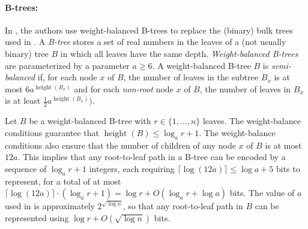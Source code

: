 \documentclass{patmorin}
\DeclareMathOperator{\height}{height}
\renewcommand{\ge}{\geqslant}
\renewcommand{\le}{\leqslant}
\newcommand{\defin}[1]{\emph{\textcolor{brightmaroon}{#1}}}
\begin{document}

\paragraph{B-trees:}

  In \cite{alstrup.rauhe:improved}, the authors use weight-balanced B-trees to replace the (binary) bulk trees used in \cite{dujmovic.esperet.ea:adjacency}.  A \defin{B-tree} stores a set of real numbers in the leaves of a (not usually binary) tree $B$ in which all leaves have the same depth. \defin{Weight-balanced B-trees} are parameterized by a parameter $a\ge 6$.  A weight-balanced B-tree $B$ is \defin{semi-balanced} if, for each node $x$ of $B$, the number of leaves in the subtree $B_x$ is at most $6a^{\height(B_x)}$ and for each \emph{non-root} node $x$ of $B$, the number of leaves in $B_x$ is at least $\tfrac{1}{2}a^{\height(B_x)})$.

  Let $B$ be a weight-balanced B-tree with $r\in \{1,\ldots,n\}$ leaves.  The weight-balance conditions guarantee that $\height(B)\le \log_a r + 1$.  The weight-balance conditions also ensure that the number of children of any node $x$ of $B$ is at most $12a$.  This implies that any root-to-leaf path in a B-tree can be encoded by a sequence of $\log_a r+1$ integers, each requiring $\lceil\log(12a)\rceil\le \log a + 5$ bits to represent, for a total of at most $\lceil\log(12a)\rceil\cdot(\log_a r+1)=\log r + O(\log_a r + \log a)$ bits.  The value of $a$ used in \cite{alstrup.rauhe:improved} is approximately $2^{\sqrt{\log n}}$, so that any root-to-leaf path in $B$ can be represented using $\log r + O(\sqrt{\log n})$ bits.
\end{document}
